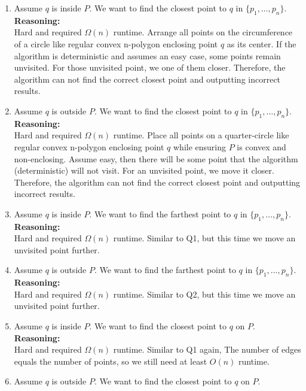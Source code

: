 \documentclass{article}
\begin{document}
\begin{enumerate}
    \item Assume $q$ is inside $P$. We want to find the closest point to $q$ in $\{p_1, \dots, p_n\}$.
    \\
    \textbf{Reasoning: }
    \\
    Hard and required $\Omega(n)$ runtime. Arrange all points on the circumference of a circle like regular convex n-polygon enclosing point $q$ as its center. 
    If the algorithm is deterministic and assumes an easy case, some points remain unvisited. For those unvisited point, we one of them closer.
    Therefore, the algorithm can not find the correct closest point and outputting incorrect results.
    \item Assume $q$ is outside $P$. We want to find the closest point to $q$ in $\{p_1, \dots, p_n\}$.
    \\
    \textbf{Reasoning: }
    \\
    Hard and required $\Omega(n)$ runtime. Place all points on a quarter-circle like regular convex n-polygon enclosing point $q$ while ensuring $P$ is convex and non-enclosing.
    Assume easy, then there will be some point that the algorithm (deterministic) will not visit. For an unvisited point, we move it closer. 
    Therefore, the algorithm can not find the correct closest point and outputting incorrect results.
    \item Assume $q$ is inside $P$. We want to find the farthest point to $q$ in $\{p_1, \dots, p_n\}$.
    \\
    \textbf{Reasoning: }
    \\
    Hard and required $\Omega(n)$ runtime. Similar to Q1, but this time we move an unvisited point further.
    \item Assume $q$ is outside $P$. We want to find the farthest point to $q$ in $\{p_1, \dots, p_n\}$.
    \\
    \textbf{Reasoning: }
    \\
    Hard and required $\Omega(n)$ runtime. Similar to Q2, but this time we move an unvisited point further.
    \item Assume $q$ is inside $P$. We want to find the closest point to $q$ on $P$.
    \\
    \textbf{Reasoning: }
    \\
    Hard and required $\Omega(n)$ runtime. Similar to Q1 again, The number of edges equals the number of points, so we still need at least $O(n)$ runtime.
    \item Assume $q$ is outside $P$. We want to find the closest point to $q$ on $P$.

\end{enumerate}
\end{document}
